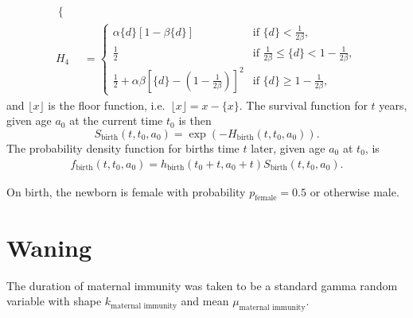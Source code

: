 \documentclass[12pt]{article}
\newcommand{\md}{\mathrm{d}}
\begin{document}
\begin{equation}
\begin{split}
\begin{cases}
    \end{cases}
    \\
    H_4 &=
    \begin{cases}
      \alpha \{d\} \left[1 - \beta \{d\}\right]
      & \text{if $\{d\} < \frac{1}{2 \beta}$},
      \\
      \frac{1}{2}
      & \text{if $\frac{1}{2 \beta} \leq \{d\} <
        1 - \frac{1}{2 \beta}$},
      \\
      \frac{1}{2}
      + \alpha \beta
      \left[\{d\} - \left(1 - \frac{1}{2 \beta}\right)\right]^2
      & \text{if $\{d\} \geq 1 - \frac{1}{2 \beta}$},
    \end{cases}
  \end{split}
\end{equation}
and $\lfloor x \rfloor$ is the floor function,
i.e.~$\lfloor x \rfloor = x - \{x\}$.
The survival function for $t$ years, given age
$a_0$ at the current time $t_0$ is then
\begin{equation}
  S_{\text{birth}}(t, t_0, a_0) = \exp\left(- H_{\text{birth}}(t, t_0, a_0)\right).
\end{equation}
The probability density function for births time $t$ later, given age
$a_0$ at $t_0$, is
\begin{align}
  f_{\text{birth}}(t, t_0, a_0) =
  h_{\text{birth}}(t_0 + t, a_0 + t)
  S_{\text{birth}}(t, t_0, a_0).
\end{align}


On birth, the newborn is female with probability
$p_{\text{female}} = 0.5$ or otherwise male.


\section{Waning}

The duration of maternal immunity was taken to be a standard gamma
random variable with shape $k_{\text{maternal immunity}}$
and mean $\mu_{\text{maternal immunity}}$.
\end{document}
